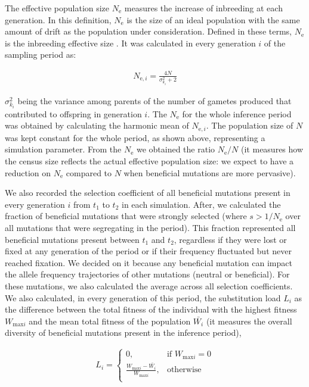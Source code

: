 \documentclass[a4paper, 12pt]{article}
\begin{document}
The effective population size $N_{\mathrm{e}}$ measures the increase of inbreeding at each generation. In this definition, $N_{\mathrm{e}}$ is the size of an ideal population with the same amount of drift as the population under consideration. Defined in these terms, $N_{\mathrm{e}}$ is the inbreeding effective size \citep{Santiago:1995wx, Walsh:2018tv}. It was calculated in every generation $i$ of the sampling period as:

\begin{gather*}
  N_{\mathrm{e},i} = \frac{4N}{\sigma^2_{k_i} + 2} 
\end{gather*}

\noindent $\sigma^2_{k_i}$ being the variance among parents of the number of gametes produced that contributed to offspring in generation $i$. The $N_\mathrm{e}$ for the whole inference period was obtained by calculating the harmonic mean of $N_{\mathrm{e},i}$. The population size of $N$ was kept constant for the whole period, as shown above, representing a simulation parameter. From the $N_\mathrm{e}$ we obtained the ratio $N_\mathrm{e}/N$ (it measures how the census size reflects the actual effective population size: we expect to have a reduction on $N_{\mathrm{e}}$ compared to $N$ when beneficial mutations are more pervasive). 

We also recorded the selection coefficient of all beneficial mutations present in every generation $i$ from $t_1$ to $t_2$ in each simulation. After, we calculated the fraction of beneficial mutations that were strongly selected (where $s > 1/N_{\mathrm{e}}$ over all mutations that were segregating in the period). This fraction represented all beneficial mutations present between $t_1$ and $t_2$, regardless if they were lost or fixed at any generation of the period or if their frequency fluctuated but never reached fixation. We decided on it because any beneficial mutation can impact the allele frequency trajectories of other mutations (neutral or beneficial). For these mutations, we also calculated the average across all selection coefficients. We also calculated, in every generation of this period, the substitution load $L_i$ as the difference between the total fitness of the individual with the highest fitness $W_{\mathrm{max}i}$ and the mean total fitness of the population $\bar{W_{i}}$ (it measures the overall diversity of beneficial mutations present in the inference period),

\begin{gather*}
  L_i = 
\begin{cases}
  0, & \text{if } W_{\mathrm{max}i}=0\\
  \frac{W_{\mathrm{max}i} - \bar{W_{i}}}{W_{\mathrm{max}i}},& \text{otherwise}\\
\end{cases}
\end{gather*}
\end{document}

